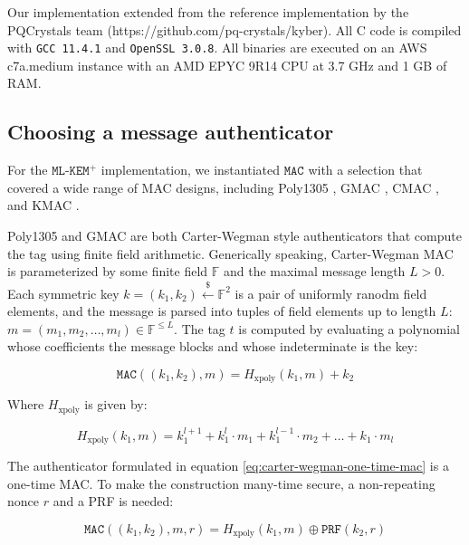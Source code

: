 \documentclass[journal=tches,submission]{iacrtrans}
\newcommand{\mac}{\texttt{MAC}}
\newcommand{\leftsample}{\stackrel{\$}{\leftarrow}}
\begin{document}
Our implementation extended from the reference implementation by the PQCrystals team (https://github.com/pq-crystals/kyber). All C code is compiled with \texttt{GCC 11.4.1} and \texttt{OpenSSL 3.0.8}. All binaries are executed on an AWS c7a.medium instance with an AMD EPYC 9R14 CPU at 3.7 GHz and 1 GB of RAM.

\subsection{Choosing a message authenticator}\label{sec:choosing-a-message-authenticator}
For the $\texttt{ML-KEM}^+$ implementation, we instantiated $\mac$ with a selection that covered a wide range of MAC designs, including Poly1305 \cite{bernstein2005poly1305}, GMAC \cite{mcgrew2004galois}, CMAC \cite{iwata2003omac}\cite{black2000cbc}, and KMAC \cite{SP80053r4}.

Poly1305 and GMAC are both Carter-Wegman style authenticators \cite{wegman1981new} that compute the tag using finite field arithmetic. Generically speaking, Carter-Wegman MAC is parameterized by some finite field $\mathbb{F}$ and the maximal message length $L > 0$. Each symmetric key $k = (k_1, k_2) \leftsample \mathbb{F}^2$ is a pair of uniformly ranodm field elements, and the message is parsed into tuples of field elements up to length $L$: $m = (m_1, m_2, \ldots, m_l) \in \mathbb{F}^{\leq L}$. The tag $t$ is computed by evaluating a polynomial whose coefficients the message blocks and whose indeterminate is the key:

\begin{equation}\label{eq:carter-wegman-one-time-mac}
    \mac((k_1, k_2), m) = H_\text{xpoly}(k_1, m) + k_2
\end{equation}

Where $H_\text{xpoly}$ is given by:

\begin{equation*}
    H_\text{xpoly}(k_1, m) = k_1^{l+1} + k_1^l \cdot m_1 + k_1^{l-1} \cdot m_2 + \ldots + k_1 \cdot m_l
\end{equation*}

The authenticator formulated in equation \ref{eq:carter-wegman-one-time-mac} is a one-time MAC. To make the construction many-time secure, a non-repeating nonce $r$ and a PRF is needed:

\begin{equation*}
    \mac((k_1, k_2), m, r) = H_\text{xpoly}(k_1, m) \oplus \texttt{PRF}(k_2, r)
\end{equation*}
\end{document}
